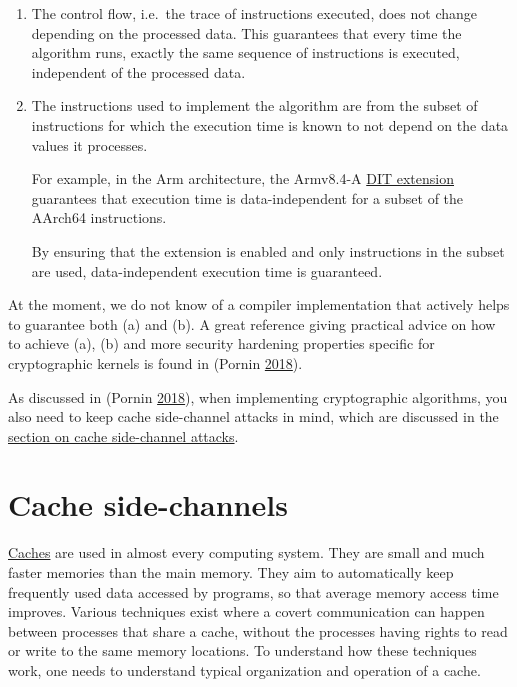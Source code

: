 \documentclass[a4paper,]{report}
\begin{document}
\begin{enumerate}
\def\labelenumi{\alph{enumi})}
\item
  The control flow, i.e.~the trace of instructions executed, does not
  change depending on the processed data. This guarantees that every
  time the algorithm runs, exactly the same sequence of instructions is
  executed, independent of the processed data.
\item
  The instructions used to implement the algorithm are from the subset
  of instructions for which the execution time is known to not depend on
  the data values it processes.

  For example, in the Arm architecture, the Armv8.4-A
  \href{https://developer.arm.com/documentation/ddi0595/2021-06/AArch64-Registers/DIT--Data-Independent-Timing}{DIT
  extension} guarantees that execution time is data-independent for a
  subset of the AArch64 instructions.

  By ensuring that the extension is enabled and only instructions in the
  subset are used, data-independent execution time is guaranteed.
\end{enumerate}

At the moment, we do not know of a compiler implementation that actively
helps to guarantee both (a) and (b). A great reference giving practical
advice on how to achieve (a), (b) and more security hardening properties
specific for cryptographic kernels is found in (Pornin
\protect\hyperlink{ref-Pornin2018}{2018}).

As discussed in (Pornin \protect\hyperlink{ref-Pornin2018}{2018}), when
implementing cryptographic algorithms, you also need to keep cache
side-channel attacks in mind, which are discussed in the
\protect\hyperlink{cache-side-channel-attacks}{section on cache
side-channel attacks}.

\hypertarget{cache-side-channels}{%
\section{Cache side-channels}\label{cache-side-channels}}

\href{https://en.wikipedia.org/wiki/Cache_(computing)}{Caches}
are used in almost every computing system. They are small and much
faster memories than the main memory. They aim to automatically keep
frequently used data accessed by programs, so that average memory access
time improves. Various techniques exist where a covert communication can
happen between processes that share a cache, without the processes
having rights to read or write to the same memory locations. To
understand how these techniques work, one needs to understand typical
organization and operation of a cache.
\end{document}
